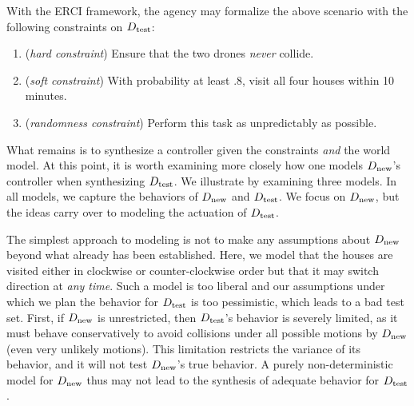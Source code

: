 With the ERCI framework, the agency may formalize the above scenario with the
following constraints on ${D_{\text{test}}}$:
\begin{enumerate}
\item (\emph{hard constraint}) Ensure that the two drones \emph{never} collide.
\item (\emph{soft constraint}) With probability at least $.8$, visit all four houses within 10 minutes.
\item (\emph{randomness constraint}) Perform this task as unpredictably as possible.
\end{enumerate}
What  remains is to synthesize a controller given the constraints
\emph{and} the world model. At this point, it is worth examining more
closely how one models ${D_{\text{new}}}$'s controller when synthesizing
${D_{\text{test}}}$. We illustrate by examining three models. In all models, we capture the behaviors of ${D_{\text{new}}}$ and ${D_{\text{test}}}$. We focus on ${D_{\text{new}}}$, but the ideas carry over to modeling the actuation of ${D_{\text{test}}}$.
%

The simplest approach to modeling is not to make any assumptions about  ${D_{\text{new}}}$ beyond what already has been established. Here, we model that the houses are visited either in clockwise or counter-clockwise order but that it may switch direction at \emph{any time}. 
Such a model is too liberal and our assumptions under which we plan the behavior for ${D_{\text{test}}}$ is too pessimistic, which leads to a bad test set.
First, if ${D_{\text{new}}}$ is unrestricted, then ${D_{\text{test}}}$'s behavior is severely limited, as it must behave conservatively to avoid collisions under all possible motions by ${D_{\text{new}}}$ (even very unlikely motions). This limitation restricts the variance of its behavior, and it will not test ${D_{\text{new}}}$'s true behavior. 
A purely non-deterministic model for ${D_{\text{new}}}$ thus may not lead to the synthesis of adequate behavior for ${D_{\text{test}}}$. 

